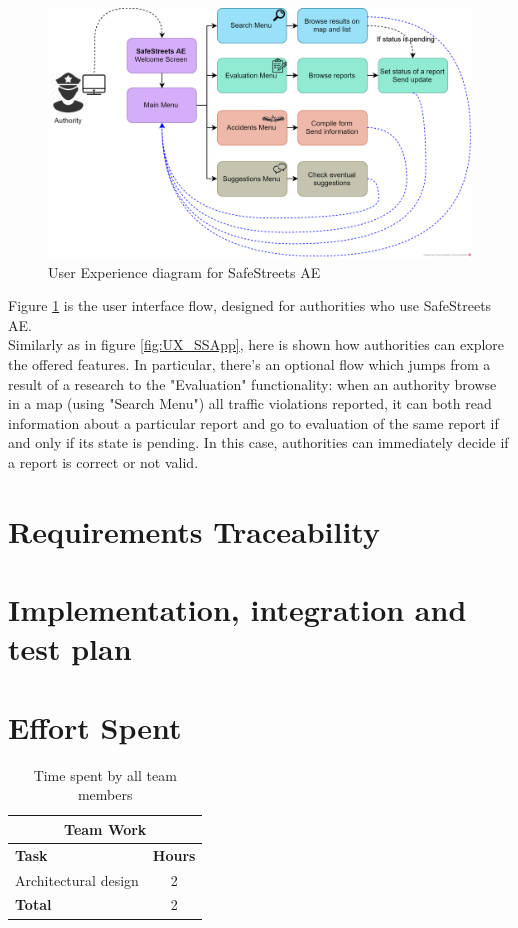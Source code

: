 \documentclass{article}
\begin{document}
		\begin{figure}[H]
			\centering
			\includegraphics[width=1\textwidth]{diagrams/UXSafeStreetsAE.png}
			\caption[User Experience diagram for SafeStreets AE]{User Experience diagram for SafeStreets AE}
			\label{fig:UX_SSAE}
		\end{figure}
	
		Figure \ref{fig:UX_SSAE} is the user interface flow, designed for authorities who use SafeStreets AE.\\
		Similarly as in figure \ref{fig:UX_SSApp}, here is shown how authorities can explore the offered features. In particular, there's an optional flow which jumps from a result of a research to the "Evaluation" functionality: when an authority browse in a map (using "Search Menu") all traffic violations reported, it can both read information about a particular report and go to evaluation of the same report if and only if its state is pending. In this case, authorities can immediately decide if a report is correct or not valid.
		
	\clearpage	
	\section{Requirements Traceability}
	\clearpage	
	\section{Implementation, integration and test plan}
	
	\clearpage
	\section{Effort Spent}
		\begin{table}[h]
			\centering
			\begin{tabular}{l c}
				\hline\hline
				\multicolumn{2}{c}{\textbf{Team Work}} \\
				\hline
				\textbf{Task} & \textbf{Hours} \\ [0.5ex]
				\hline
				Architectural design & 2  \\
				
				\hline
				\textbf{Total} & 2  \\
				\hline
			\end{tabular}
			\caption{Time spent by all team members}
			\label{fig:Time spent by all team members}
		\end{table}
		
\end{document}
